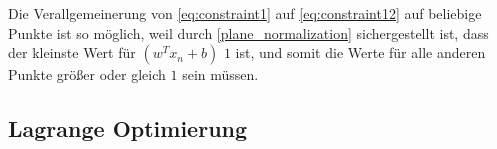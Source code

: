 \documentclass[a4paper,11pt,twoside]{scrreprt}
\begin{document}
Die Verallgemeinerung von \autoref{eq:constraint1} auf \autoref{eq:constraint12} auf beliebige Punkte ist so möglich, weil durch \autoref{plane_normalization} sichergestellt ist, dass der kleinste Wert für $(w^{T} x_{n} + b)$ $1$ ist, und somit die Werte für alle anderen Punkte größer oder gleich $1$ sein müssen. \\

\subsection{Lagrange Optimierung}





\clearpage
{}
{}
\printbibliography
\end{document}
